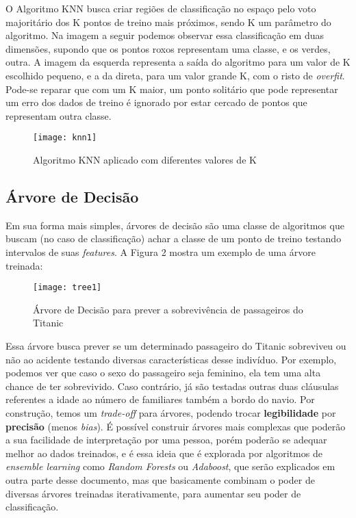 O Algoritmo KNN busca criar regiões de classificação no espaço pelo voto majoritário dos K pontos de treino mais próximos, sendo K um parâmetro do algoritmo. Na imagem a seguir podemos observar essa classificação em duas dimensões, supondo que os pontos roxos representam uma classe, e os verdes, outra. A imagem da esquerda representa a saída do algoritmo para um valor de K escolhido pequeno, e a da direta, para um valor grande K, com o risto de \textit{overfit}. Pode-se reparar que com um K maior, um ponto solitário que pode representar um erro dos dados de treino é ignorado por estar cercado de pontos que representam outra classe.

\begin{figure}[ht]
	\centering
	\caption{Algoritmo KNN aplicado com diferentes valores de K}
  \texttt{[image: knn1]}
\label{fig:knn1}  

\end{figure}

\subsection{Árvore de Decisão}



Em sua forma mais simples, árvores de decisão são uma classe de algoritmos que buscam (no caso de classificação) achar a classe de um ponto de treino testando intervalos de suas \textit{features}. A Figura 2 mostra um exemplo de uma árvore treinada:


\begin{figure}[ht]
	\centering
	\caption{Árvore de Decisão para prever a sobrevivência de passageiros do Titanic}
  \texttt{[image: tree1]}
\label{fig:tree1}  

\end{figure}

Essa árvore busca prever se um determinado passageiro do Titanic sobreviveu ou não ao acidente testando diversas características desse indivíduo. Por exemplo, podemos ver que caso o sexo do passageiro seja feminino, ela tem uma alta chance de ter sobrevivido. Caso contrário, já são testadas outras duas cláusulas referentes a idade ao número de familiares também a bordo do navio. Por construção, temos um \textit{trade-off} para árvores, podendo trocar \textbf{legibilidade} por \textbf{precisão} (menos \textit{bias}). É possível construir árvores mais complexas que poderão a sua facilidade de interpretação por uma pessoa, porém poderão se adequar melhor ao dados treinados, e é essa ideia que é explorada por algoritmos de \textit{ensemble learning} como \textit{Random Forests} ou \textit{Adaboost}, que serão explicados em outra parte desse documento, mas que basicamente combinam o poder de diversas árvores treinadas iterativamente, para aumentar seu poder de classificação.


